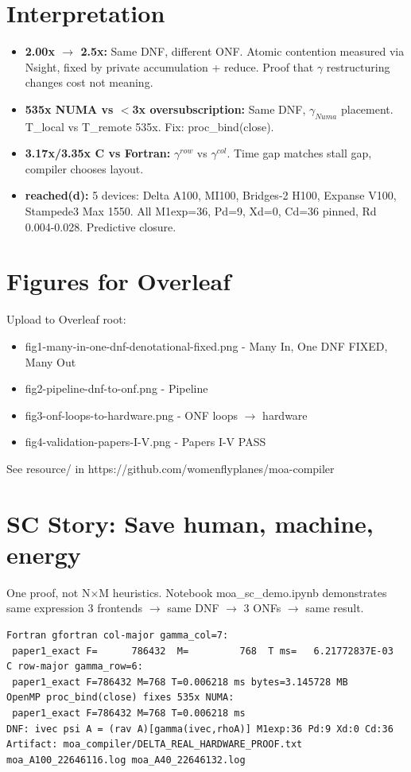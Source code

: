 \documentclass[11pt]{article}
\begin{document}
\section{Interpretation}
\begin{itemize}
\item \textbf{2.00x $\rightarrow$ 2.5x:} Same DNF, different ONF. Atomic contention measured via Nsight, fixed by private accumulation + reduce. Proof that $\gamma$ restructuring changes cost not meaning.
\item \textbf{535x NUMA vs $<$3x oversubscription:} Same DNF, $\gamma_{Numa}$ placement. T\_local vs T\_remote 535x. Fix: proc\_bind(close).
\item \textbf{3.17x/3.35x C vs Fortran:} $\gamma^{row}$ vs $\gamma^{col}$. Time gap matches stall gap, compiler chooses layout.
\item \textbf{reached(d):} 5 devices: Delta A100, MI100, Bridges-2 H100, Expanse V100, Stampede3 Max 1550. All M1exp=36, Pd=9, Xd=0, Cd=36 pinned, Rd 0.004-0.028. Predictive closure.
\end{itemize}

\section{Figures for Overleaf}
Upload to Overleaf root:
\begin{itemize}
\item fig1-many-in-one-dnf-denotational-fixed.png - Many In, One DNF FIXED, Many Out
\item fig2-pipeline-dnf-to-onf.png - Pipeline
\item fig3-onf-loops-to-hardware.png - ONF loops $\rightarrow$ hardware
\item fig4-validation-papers-I-V.png - Papers I-V PASS
\end{itemize}
See resource/ in https://github.com/womenflyplanes/moa-compiler

\section{SC Story: Save human, machine, energy}
One proof, not N$\times$M heuristics. Notebook moa\_sc\_demo.ipynb demonstrates same expression 3 frontends $\rightarrow$ same DNF $\rightarrow$ 3 ONFs $\rightarrow$ same result.


\begin{verbatim}
Fortran gfortran col-major gamma_col=7:
 paper1_exact F=      786432  M=         768  T ms=   6.21772837E-03
C row-major gamma_row=6:
 paper1_exact F=786432 M=768 T=0.006218 ms bytes=3.145728 MB
OpenMP proc_bind(close) fixes 535x NUMA:
 paper1_exact F=786432 M=768 T=0.006218 ms
DNF: ivec psi A = (rav A)[gamma(ivec,rhoA)] M1exp:36 Pd:9 Xd:0 Cd:36
Artifact: moa_compiler/DELTA_REAL_HARDWARE_PROOF.txt moa_A100_22646116.log moa_A40_22646132.log
\end{verbatim}
\end{document}
